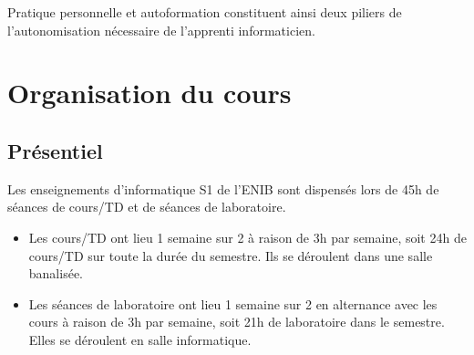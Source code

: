 \begin{description}
	Pratique personnelle et autoformation constituent ainsi deux piliers de
	l'autonomisation nécessaire de l'apprenti informaticien.
\end{description}


\section{Organisation du cours}

\subsection{Présentiel}
Les enseignements d'informatique S1 de l'ENIB sont dispensés lors de 45h
de séances de cours/TD et de séances de laboratoire.
\begin{itemize}
\item Les cours/TD ont lieu 1 semaine sur 2 à raison de 3h par semaine, soit
24h de cours/TD sur toute la durée du semestre. Ils se déroulent dans une salle
banalisée.
\item Les séances de laboratoire ont lieu 1 semaine sur 2 en alternance avec les 
cours à raison de 3h par semaine, soit 21h de laboratoire dans le semestre. Elles
se déroulent en salle informatique.
\end{itemize}


